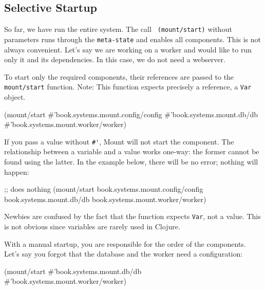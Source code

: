 \subsection{Selective Startup}

\label{mount-selective}

So far, we have run the entire system. The call \verb| (mount/start)| without parameters runs through the \verb|meta-state| and enables all components. This is not always convenient. Let's say we are working on a worker and would like to run only it and its dependencies. In this case, we do not need a webserver.

To start only the required components, their references are passed to the \verb|mount/start| function. Note: This function expects precisely a reference, a \verb|Var| object.

\begin{english}
  \begin{clojure}
(mount/start
  #'book.systems.mount.config/config
  #'book.systems.mount.db/db
  #'book.systems.mount.worker/worker)
  \end{clojure}
\end{english}

If you pass a value without \verb|#'|, Mount will not start the component. The relationship between a variable and a value works one-way: the former cannot be found using the latter. In the example below, there will be no error; nothing will happen:

\begin{english}
  \begin{clojure}
;; does nothing
(mount/start
  book.systems.mount.config/config
  book.systems.mount.db/db
  book.systems.mount.worker/worker)
  \end{clojure}
\end{english}


Newbies are confused by the fact that the function expects \verb|Var|, not a value. This is not obvious since variables are rarely used in Clojure.

With a manual startup, you are responsible for the order of the components. Let's say you forgot that the database and the worker need a configuration:

\begin{english}
  \begin{clojure}
(mount/start
  #'book.systems.mount.db/db
  #'book.systems.mount.worker/worker)
  \end{clojure}
\end{english}

